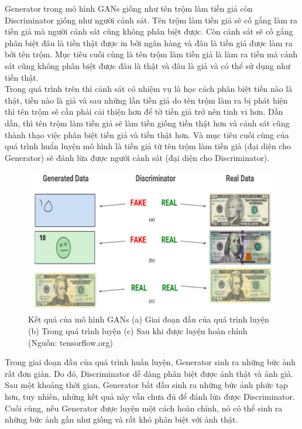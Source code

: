 {    \noindent Generator trong mô hình GANs giống như tên trộm làm tiền giả còn Discriminator giống như người cảnh sát. Tên trộm làm tiền giả sẽ cố gắng làm ra tiền giả mà người cảnh sát cũng không phân biệt được. Còn cảnh sát sẽ cố gắng phân biệt đâu là tiền thật được in bởi ngân hàng và đâu là tiền giả được làm ra bởi tên trộm. Mục tiêu cuối cùng là tên trộm làm tiền giả là làm ra tiền mà cảnh sát cũng không phân biệt được đâu là thật và đâu là giả và có thể sử dụng như tiền thật.\\
    Trong quá trình trên thì cảnh sát có nhiệm vụ là học cách phân biệt tiền nào là thật, tiền nào là giả và sau những lần tiền giả do tên trộm làm ra bị phát hiện thì tên trộm sẽ cần phải cải thiện hơn để tờ tiền giả trở nên tinh vi hơn. Dần dần, thì tên trộm làm tiền giả sẽ làm tiền giống tiền thật hơn và cảnh sát cũng thành thạo việc phân biệt tiền giả và tiền thật hơn. Và mục tiêu cuối cùng của quá trình huẩn luyện mô hình là tiền giả từ tên trộm làm tiền giả (đại diện cho Generator) sẽ đánh lừa được người cảnh sát (đại diện cho Discriminator).
    
    \begin{figure}[H]
    \centering
    \includegraphics[width=12cm] {images/fake_vs_real.png}
    \caption{Kết quả của mô hình GANs (a) Giai đoạn đầu của quá trình luyện (b) Trong quá trình luyện (c) Sau khi được luyện hoàn chỉnh (Nguồn: tensorflow.org)}
    \label{fig:fake_vs_real}
    \end{figure}
    
    \noindent Trong giai đoạn đầu của quá trình huấn luyện, Generator sinh ra những bức ảnh rất đơn giản. Do đó, Discriminator dễ dàng phân biệt được ảnh thật và ảnh giả. Sau một khoảng thời gian, Generator bắt đầu sinh ra những bức ảnh phức tạp hơn, tuy nhiên, những kết quả này vẫn chưa đủ để đánh lừa được Discriminator. Cuối cùng, nếu Generator được luyện một cách hoàn chỉnh, nó có thể sinh ra những bức ảnh gần như giống và rất khó phân biệt với ảnh thật.
    
}

